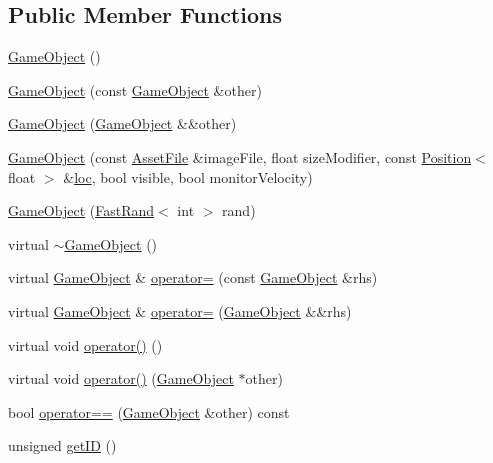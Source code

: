 \subsection*{Public Member Functions}
\begin{DoxyCompactItemize}
\item 
\hyperlink{class_game_object_a0348e3ee2e83d56eafca7a3547f432c4}{Game\-Object} ()
\item 
\hyperlink{class_game_object_ab13374d070cfe6a1459539d54c671eba}{Game\-Object} (const \hyperlink{class_game_object}{Game\-Object} \&other)
\item 
\hyperlink{class_game_object_ab415bbda3ab836e5de5e73c0a9d50ba3}{Game\-Object} (\hyperlink{class_game_object}{Game\-Object} \&\&other)
\item 
\hyperlink{class_game_object_af784d96f9ca701cd705050ce1baf6bd2}{Game\-Object} (const \hyperlink{struct_asset_file}{Asset\-File} \&image\-File, float size\-Modifier, const \hyperlink{struct_position}{Position}$<$ float $>$ \&\hyperlink{class_game_object_a6858e668e7d2c5ded850b952aaacd905}{loc}, bool visible, bool monitor\-Velocity)
\item 
\hyperlink{class_game_object_a039a66e3278f6a75ad0021ffda1b1a71}{Game\-Object} (\hyperlink{class_fast_rand}{Fast\-Rand}$<$ int $>$ rand)
\item 
virtual \hyperlink{class_game_object_ab82dfdb656f9051c0587e6593b2dda97}{$\sim$\-Game\-Object} ()
\item 
virtual \hyperlink{class_game_object}{Game\-Object} \& \hyperlink{class_game_object_afa8505b16b7f5fe0b825d59fcee17291}{operator=} (const \hyperlink{class_game_object}{Game\-Object} \&rhs)
\item 
virtual \hyperlink{class_game_object}{Game\-Object} \& \hyperlink{class_game_object_a428579a3f2d8eb2c9e37bd4452d18d3b}{operator=} (\hyperlink{class_game_object}{Game\-Object} \&\&rhs)
\item 
virtual void \hyperlink{class_game_object_ab8fccd5edcbebad0553aa4336a71452a}{operator()} ()
\item 
virtual void \hyperlink{class_game_object_afe9e6ee87d3062c80a9c560a12bfc279}{operator()} (\hyperlink{class_game_object}{Game\-Object} $\ast$other)
\item 
bool \hyperlink{class_game_object_ab8e7bb6eaae69c9e282efb22c3996499}{operator==} (\hyperlink{class_game_object}{Game\-Object} \&other) const 
\item 
unsigned \hyperlink{class_game_object_ac4692b8584d58cabc918e53e54767008}{get\-I\-D} ()
\item 

\end{DoxyCompactItemize}
